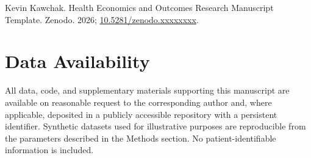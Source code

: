 Kevin Kawchak. Health Economics and Outcomes Research Manuscript Template. Zenodo. 2026;
\href{https://doi.org/10.5281/zenodo.xxxxxxxx}{10.5281/zenodo.xxxxxxxx}.

{}
\section*{Data Availability}
\label{sec:data}

All data, code, and supplementary materials supporting this manuscript are
available on reasonable request to the corresponding author and, where
applicable, deposited in a publicly accessible repository with a persistent
identifier. Synthetic datasets used for illustrative purposes are
reproducible from the parameters described in the Methods section. No
patient-identifiable information is included.
